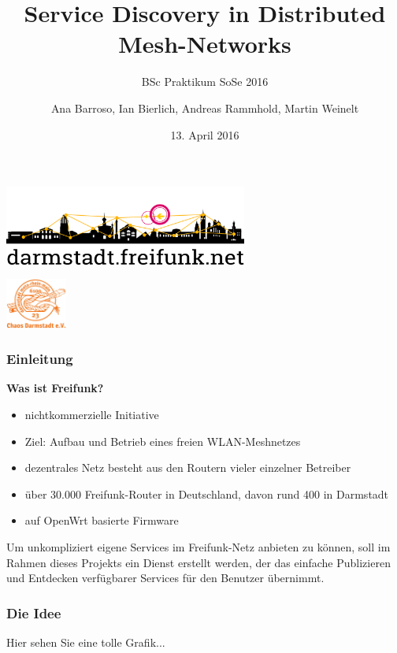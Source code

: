 \documentclass[accentcolor=tud6b,colorbacktitle,inverttitle,landscape,german,presentation,t]{tudbeamer}
\begin{document}
	
	\title[Service Discovery in Distributed Mesh-Networks]{Service Discovery in Distributed Mesh-Networks}
	\subtitle{BSc Praktikum SoSe 2016}
	
	\author{Ana Barroso, Ian Bierlich, Andreas Rammhold, Martin Weinelt}


	\date{13. April 2016}
	
	\begin{titleframe}
		\begin{center}
			\vspace{1cm}
			\includegraphics[width=0.6\textwidth]{images/logo-skyline-text-below}
			\vspace{1.4cm}
		\end{center}
			\flushright
			\includegraphics[width=0.15\textwidth]{images/cda}
	\end{titleframe}
	
	\begin{frame}
		\frametitle{Einleitung}
		\vfill
		\textbf{Was ist Freifunk?}
		\vfill
		\begin{itemize}
			\item nichtkommerzielle Initiative
			\item Ziel: Aufbau und Betrieb eines freien WLAN-Meshnetzes
			\item dezentrales Netz besteht aus den Routern vieler einzelner Betreiber
			\item über 30.000 Freifunk-Router in Deutschland, davon rund 400 in Darmstadt
			\item auf OpenWrt basierte Firmware
		\end{itemize}
		\vfill
		\pause
		Um unkompliziert eigene Services im Freifunk-Netz anbieten zu können, soll im Rahmen dieses Projekts ein Dienst erstellt werden, der das einfache Publizieren und Entdecken verfügbarer Services für den Benutzer übernimmt.
	\end{frame}

	\begin{frame}
		\frametitle{Die Idee}
		\vfill
		Hier sehen Sie eine tolle Grafik...
		\vfill
	\end{frame}
	
\end{document}

